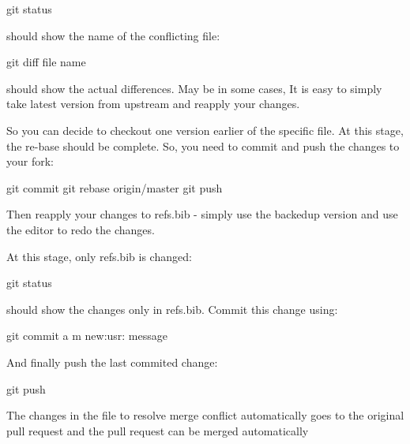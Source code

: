 \begin{sphinxVerbatim}[commandchars=\\\{\}]
\PYGZdl{} git status
\end{sphinxVerbatim}

should show the name of the conflicting file:

\begin{sphinxVerbatim}[commandchars=\\\{\}]
\PYGZdl{} git diff \PYGZlt{}file name\PYGZgt{}
\end{sphinxVerbatim}

should show the actual differences. May be in some cases, It is easy
to simply take latest version from upstream and reapply your changes.

So you can decide to checkout one version earlier of the specific
file. At this stage, the re-base should be complete. So, you need to
commit and push the changes to your fork:

\begin{sphinxVerbatim}[commandchars=\\\{\}]
\PYGZdl{} git commit
\PYGZdl{} git rebase origin/master
\PYGZdl{} git push
\end{sphinxVerbatim}

Then reapply your changes to refs.bib - simply use the backedup
version and use the editor to redo the changes.

At this stage, only refs.bib is changed:

\begin{sphinxVerbatim}[commandchars=\\\{\}]
\PYGZdl{} git status
\end{sphinxVerbatim}

should show the changes only in refs.bib.
Commit this change using:

\begin{sphinxVerbatim}[commandchars=\\\{\}]
\PYGZdl{} git commit \PYGZhy{}a \PYGZhy{}m \PYGZdq{}new:usr: \PYGZlt{}message\PYGZgt{}\PYGZdq{}
\end{sphinxVerbatim}

And finally push the last commited change:

\begin{sphinxVerbatim}[commandchars=\\\{\}]
\PYGZdl{} git push
\end{sphinxVerbatim}

The changes in the file to resolve merge conflict automatically goes
to the original pull request and the pull request can be merged
automatically


